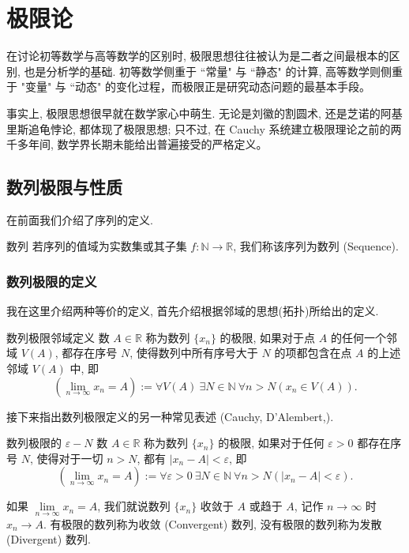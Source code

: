 \documentclass[cn,toc=twocol]{elegantbook}
\newcommand{\R}{\mathbb{R}}
\newcommand{\N}{\mathbb{N}}
\begin{document}
\chapter{极限论}

在讨论初等数学与高等数学的区别时, 极限思想往往被认为是二者之间最根本的区别, 也是分析学的基础. 初等数学侧重于 ``常量" 与 ``静态" 的计算, 高等数学则侧重于 "变量" 与 ``动态" 的变化过程，而极限正是研究动态问题的最基本手段。

事实上, 极限思想很早就在数学家心中萌生. 无论是刘徽的割圆术, 还是芝诺的阿基里斯追龟悖论, 都体现了极限思想; 只不过, 在 Cauchy 系统建立极限理论之前的两千多年间, 数学界长期未能给出普遍接受的严格定义。

\section{数列极限与性质}
在前面我们介绍了序列的定义.

\begin{definition}{数列}
若序列的值域为实数集或其子集 $f:\N \to \R$, 我们称该序列为数列 (Sequence).	
\end{definition}


\subsection{数列极限的定义}

我在这里介绍两种等价的定义, 首先介绍根据邻域的思想(拓扑)所给出的定义.

\begin{definition}{数列极限邻域定义}
	数 $A \in \R$ 称为数列 $\{x_n\}$ 的极限, 如果对于点 $A$ 的任何一个邻域 $V(A)$, 都存在序号 $N$, 使得数列中所有序号大于 $N$ 的项都包含在点 $A$ 的上述邻域 $V(A)$ 中, 即
\[
	\left( \lim_{n\to\infty} x_n = A\right) := \forall V(A)\ \exists N\in\N\ \forall n > N (x_n \in V(A)).
\]
\end{definition}

接下来指出数列极限定义的另一种常见表述 (Cauchy, D’Alembert,).

\begin{definition}{数列极限的 $\varepsilon - N$}
数 $A \in \R$ 称为数列 $\{x_n\}$ 的极限, 如果对于任何 $\varepsilon >0$ 都存在序号 $N$, 使得对于一切 $n>N$, 都有 $\lvert x_n - A \rvert < \varepsilon$, 即
\[
	\left( \lim_{n\to\infty} x_n = A\right) := \forall \varepsilon > 0\ \exists N\in\N\ \forall n > N (\lvert x_n - A\rvert < \varepsilon).
\]

如果 $\lim\limits_{n\to\infty} x_n = A$, 我们就说数列 $\{x_n\}$ 收敛于 $A$ 或趋于 $A$, 记作 $n\to\infty$ 时 $x_n \to A$. 有极限的数列称为收敛 (Convergent) 数列, 没有极限的数列称为发散 (Divergent) 数列. 
\end{definition}
\end{document}
